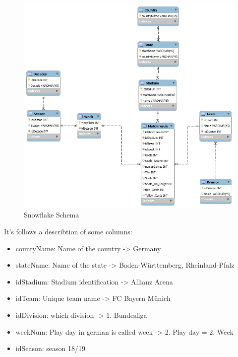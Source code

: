 \documentclass[11pt, journal]{IEEEtran}
\begin{document}
\begin{figure}[htb]
	\centering
		\includegraphics[width=1.0\columnwidth]{images/Snowflake}
	\caption{Snowflake Schema}
	\label{fig:probov}
\end{figure}
%
It’s follows a describtion of some columns:
\begin{itemize}
  \item countyName: Name of the country -> Germany
  \item stateName: Name of the state -> Baden-Württemberg, Rheinland-Pfalz
  \item idStadium: Stadium identification -> Allianz Arena
  \item idTeam: Unique team name -> FC Bayern Münich 
  \item idDivision: which division -> 1. Bundesliga
  \item weekNum: Play day in german is called week -> 2. Play day = 2. Week 
  \item idSeason: season 18/19 
\end{itemize}
\end{document}
